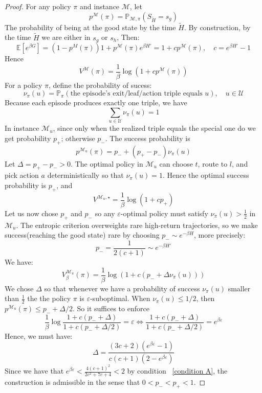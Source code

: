 \documentclass[final,12pt]{colt2026} %
\begin{document}
\begin{proof}
For any policy $\pi$ and instance $\mathcal{M}$, let
$$
p^\mathcal{M}(\pi) = \mathbb{P}_{\mathcal{M}, \pi}(S_{\tilde{H}} = s_g)
$$
The probability of being at the good state by the time $\tilde{H}$. By construction, by the time $\tilde H$ we are either in $s_g$ or $s_h$, Then:
$$
\mathbb{E}[e^{\beta G}] = (1 - p^M(\pi))  1 + p^\mathcal{M}(\pi)  e^{\beta H'} = 1 + c p^\mathcal{M}(\pi), \quad c = e^{\beta H'} - 1
$$
Hence
\begin{equation}
V^\mathcal{M}(\pi) = \frac{1}{\beta} \log \left( 1 + c p^\mathcal{M}(\pi) \right)
\end{equation}
For a policy $\pi$, define the probability of sucess: 
$$\nu_{\pi}(u) = \mathbb{P}_{\pi}(\text{the episode's exit/leaf/action triple equals } u), \quad u \in \mathcal{U}$$
Because each episode produces exactly one triple, we have
$$\sum_{u \in \mathcal{U}} \nu_{\pi}(u) = 1$$
In instance $\mathcal{M}_u$, since only when the realized triple equals the special one do we get probability $p_+$; otherwise $p_-$. The success probability is
$$p^{\mathcal{M}_u}(\pi) = p_- + (p_+ - p_-)\nu_{\pi}(u)$$
Let $\Delta = p_+ - p_- > 0$. The optimal policy in $\mathcal{M}_u$ can choose $t$, route to $l$, and pick action $a$ deterministically so that $\nu_{\pi}(u) = 1$. Hence the optimal success probability is $p_+$, and
$$V^{\mathcal{M}_u, \star} = \frac{1}{\beta} \log(1 + cp_+)$$
Let us now chose $p_+$ and $p_-$ so any $\varepsilon$-optimal policy must satisfy $\nu_\pi(u) > \frac{1}{2}$ in $\mathcal{M}_u$. 
The entropic criterion overweights rare high-return trajectories, so we make success(reaching the good state) rare by choosing $p_- \sim  e^{-\beta H}$, more precisely:
$$p_- = \frac{1}{2(c + 1)} \sim e^{-\beta H'}$$
We have:
$$V_{\beta}^{\mathcal{M}_u}(\pi) = \frac{1}{\beta} \log (1 + c(p_- + \Delta \nu_\pi(u)))$$
We chose $\Delta$ so that whenever we have a probability of success $\nu_\pi(u)$ smaller than $\frac{1}{2}$ the the policy $\pi$ is $\varepsilon$-suboptimal. When $\nu_{\pi}(u) \leq 1/2$, then $p^{\mathcal{M}_u}(\pi) \leq p_- + \Delta/2$. So it suffices to enforce
$$\frac{1}{\beta} \log \frac{1 + c(p_- + \Delta)}{1 + c(p_- + \Delta/2)} = \varepsilon \iff \frac{1 + c(p_- + \Delta)}{1 + c(p_- + \Delta/2)} = e^{\beta \varepsilon}$$
Hence, we must have:
$$\Delta = \frac{(3c + 2)(e^{\beta \varepsilon} - 1)}{c(c + 1)(2 - e^{\beta \varepsilon})} $$
Since we have that $e^{\beta \varepsilon} < \frac{4(c+1)^2}{2c^2 + 7c + 4} <2 $ by condition ~\ref{condition A}, the construction is admissible in the sense that $0 <p_- <p_+ <1$.


\end{proof}
\end{document}
